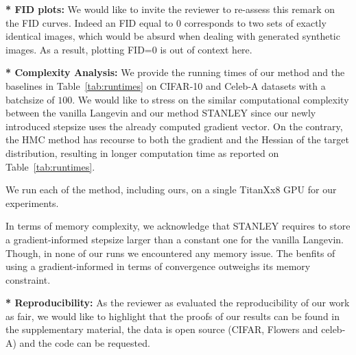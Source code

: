 \documentclass[letterpaper]{article} %
\begin{document}
\noindent \textbf{* FID plots:} We would like to invite the reviewer to re-assess this remark on the FID curves. 
Indeed an FID equal to 0 corresponds to two sets of exactly identical images, which would be absurd when dealing with generated synthetic images.
As a result, plotting FID=0 is out of context here. 



\noindent \textbf{* Complexity Analysis:} We provide the running times of our method and the baselines in Table~\ref{tab:runtimes} on CIFAR-10 and Celeb-A datasets with a batchsize of $100$.
We would like to stress on the similar computational complexity between the vanilla Langevin and our method STANLEY since our newly introduced stepsize uses the already computed gradient vector. 
On the contrary, the HMC method has recourse to both the gradient and the Hessian of the target distribution, resulting in longer computation time as reported on Table~\ref{tab:runtimes}.

\begin{table}[h]
\small
\caption{ Runtime (in s) for training our EBM during 1 epoch.}\label{tab:runtimes}
	\vspace{-0.1in}
\end{table}
We run each of the method, including ours, on a single TitanXx8 GPU for our experiments.

In terms of memory complexity, we acknowledge that STANLEY requires to store a gradient-informed stepsize larger than a constant one for the vanilla Langevin. Though, in none of our runs we encountered any memory issue. The benfits of using a gradient-informed in terms of convergence outweighs its memory constraint.

\noindent \textbf{* Reproducibility:} As the reviewer as evaluated the reproducibility of our work as fair, we would like to highlight that the proofs of our results can be found in the supplementary material, the data is open source (CIFAR, Flowers and celeb-A) and the code can be requested.
\end{document}
